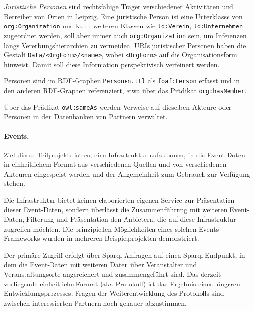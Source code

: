 \documentclass[a4paper,11pt]{article}
\begin{document}
\emph{Juristische Personen} sind rechtsfähige Träger verschiedener Aktivitäten
und Betreiber von Orten in Leipzig. Eine juristische Person ist eine
Unterklasse von \texttt{org:Organization} und kann weiteren Klassen wie
\texttt{ld:Verein}, \texttt{ld:Unternehmen} zugeordnet werden, soll aber immer
auch \texttt{org:Organization} sein, um Inferenzen längs Vererbungshierarchien
zu vermeiden. URIs juristischer Personen haben die Gestalt
\texttt{Data/<OrgForm>/<name>}, wobei \texttt{<OrgForm>} auf die
Organisationsform hinweist. Damit soll diese Information perspektivisch
verfeinert werden.

Personen sind im RDF-Graphen \texttt{Personen.ttl} als \texttt{foaf:Person}
erfasst und in den anderen RDF-Graphen referenziert, etwa über das Prädikat
\texttt{org:hasMember}.

Über das Prädikat \texttt{owl:sameAs} werden Verweise auf dieselben Akteure
oder Personen in den Datenbanken von Partnern verwaltet. 

\paragraph{Events.}
Ziel dieses Teilprojekts ist es, eine Infrastruktur aufzubauen, in die
Event-Daten in einheitlichem Format aus verschiedenen Quellen und von
verschiedenen Akteuren eingespeist werden und der Allgemeinheit zum Gebrauch
zur Verfügung stehen.

Die Infrastruktur bietet keinen elaborierten eigenen Service zur Präsentation
dieser Event-Daten, sondern überlässt die Zusammenführung mit weiteren
Event-Daten, Filterung und Präsentation den Anbietern, die auf diese
Infrastruktur zugreifen möchten. Die prinzipiellen Möglichkeiten eines solchen
Events Frameworks wurden in mehreren Beispielprojekten demonstriert. 

Der primäre Zugriff erfolgt über Sparql-Anfragen auf einen Sparql-Endpunkt, in
dem die Event-Daten mit weiteren Daten über Veranstalter und
Veranstaltungsorte angereichert und zusammengeführt sind.  Das derzeit
vorliegende einheitliche Format (aka Protokoll) ist das Ergebnis eines
längeren Entwicklungsprozesses. Fragen der Weiterentwicklung des Protokolls
sind zwischen interessierten Partnern noch genauer abzustimmen.
\end{document}
